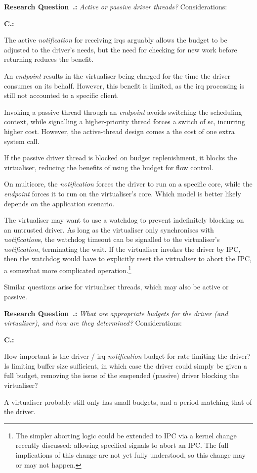 \documentclass[a4paper,12pt]{report}
\newcommand{\Obj}[1]{\textsl{#1}}
\newcounter{Qi}\setcounter{Qi}{0}
\newcounter{Qii}
\newenvironment{Question}[1][]    %
{\addtocounter{Qi}{1}\par%
  \textbf{Research Question~\arabic{Qi}.:} \emph{#1} Considerations:
  \begin{list}{\textbf{C\arabic{Qi}.\arabic{Qii}:}}%
    {\setlength\labelsep{8pt}%
      \setlength\itemindent{0pt}%
      \setlength\leftmargin{40pt}%
      \setlength\labelwidth{33pt}%
      \usecounter{Qii}}}%
{\end{list}}
\begin{document}
\begin{Question}[Active or passive driver threads?]
\item The active \Obj{notification} for receiving \glspl{irq} arguably allows
  the budget to be adjusted to the driver's needs, but the need for
  checking for new work before returning reduces the benefit.
\item An \Obj{endpoint} results in the virtualiser being charged for the time the
  driver consumes on its behalf. However, this benefit is limited, as
  the \gls{irq} processing is still not accounted to a specific client.
\item Invoking a passive thread through an \Obj{endpoint} avoids switching the scheduling context, while
  signalling a higher-priority thread forces a switch of \gls{sc}, incurring
  higher cost. However, the active-thread design comes a the cost of one extra system call.
\item If the passive driver thread is blocked on budget replenishment, it
  blocks the virtualiser, reducing the benefits of using the budget for
  flow control.
\item On multicore, the \Obj{notification} forces the driver to run on a
  specific core, while the \Obj{endpoint} forces it to run on the virtualiser's
  core. Which model is better likely  depends on the application
  scenario.
\item The virtualiser may want to use a watchdog to prevent indefinitely
  blocking on an untrusted driver. As long as the virtualiser only
  synchronises with \Obj{notification}s, the watchdog timeout can be
  signalled to the virtualiser's \Obj{notification}, terminating the wait. If the
  virtualiser invokes the driver by IPC, then the watchdog would have to
  explicitly reset the virtualiser to abort the IPC, a somewhat more
  complicated operation.\footnote{The simpler aborting logic could be
    extended to IPC via a kernel change recently discussed: allowing
    specified signals to abort an IPC. The full implications of this
    change are not yet fully understood, so this change may or may not happen.}
\end{Question}

Similar questions arise for virtualiser threads, which may also be
 active or passive.

\begin{Question}[What are appropriate budgets for the driver (and virtualiser), and how
  are they determined?]
\item How important is the driver / \gls{irq} \Obj{notification} budget for
  rate-limiting the driver? Is limiting buffer size sufficient, in
  which case the driver could simply be given a full budget, removing
  the issue of the suspended (passive) driver blocking the virtualiser?
\item A virtualiser probably still only has small budgets, and a period
  matching that of the driver.
\end{Question}
\end{document}
